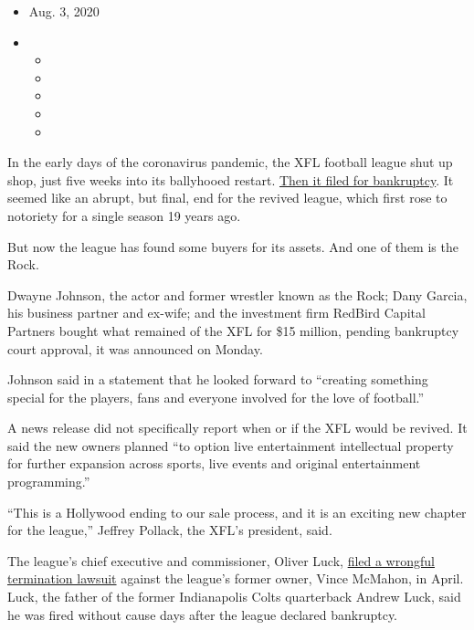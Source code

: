 \begin{itemize}
\item
  Aug. 3, 2020
\item
  \begin{itemize}
  \item
  \item
  \item
  \item
  \item
  \end{itemize}
\end{itemize}

In the early days of the coronavirus pandemic, the XFL football league
shut up shop, just five weeks into its ballyhooed restart.
\href{https://www.nytimes.com/2020/04/13/sports/football/xfl-bankruptcy-vince-mcmahon.html}{Then
it filed for bankruptcy}. It seemed like an abrupt, but final, end for
the revived league, which first rose to notoriety for a single season 19
years ago.

But now the league has found some buyers for its assets. And one of them
is the Rock.

Dwayne Johnson, the actor and former wrestler known as the Rock; Dany
Garcia, his business partner and ex-wife; and the investment firm
RedBird Capital Partners bought what remained of the XFL for \$15
million, pending bankruptcy court approval, it was announced on Monday.

Johnson said in a statement that he looked forward to ``creating
something special for the players, fans and everyone involved for the
love of football.''

A news release did not specifically report when or if the XFL would be
revived. It said the new owners planned ``to option live entertainment
intellectual property for further expansion across sports, live events
and original entertainment programming.''

``This is a Hollywood ending to our sale process, and it is an exciting
new chapter for the league,'' Jeffrey Pollack, the XFL's president,
said.

The league's chief executive and commissioner, Oliver Luck,
\href{https://www.nytimes.com/2020/04/21/sports/football/xfl-oliver-luck-vince-mcmahon-sued.html}{filed
a wrongful termination lawsuit} against the league's former owner, Vince
McMahon, in April. Luck, the father of the former Indianapolis Colts
quarterback Andrew Luck, said he was fired without cause days after the
league declared bankruptcy.

